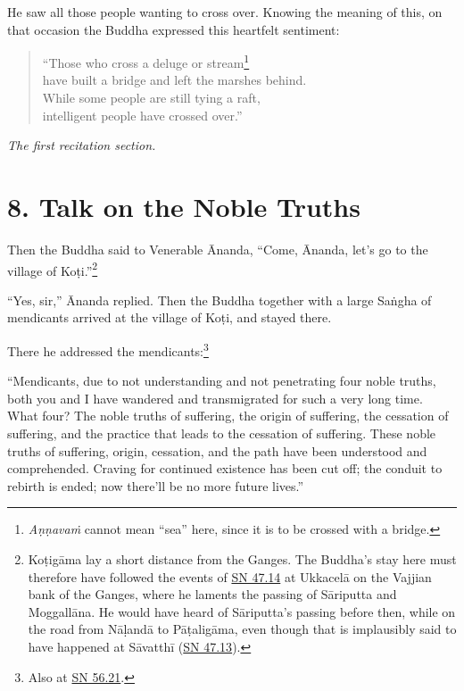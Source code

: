 \documentclass[12pt,openany]{book}%
\newcommand*{\scendsection}[1]{\begin{Center}\begin{small}\textit{#1}\end{small}\end{Center}\addvspace{1em}}
\begin{document}
He saw all those people wanting to cross over. Knowing the meaning of this, on that occasion the Buddha expressed this heartfelt sentiment: 

\begin{verse}%
“Those who cross a deluge or stream\footnote{\textit{\textsanskrit{Aṇṇavaṁ}} cannot mean “sea” here, since it is to be crossed with a bridge. } \\
have built a bridge and left the marshes behind. \\
While some people are still tying a raft, \\
intelligent people have crossed over.” 

%
\end{verse}

\scendsection{The first recitation section. }

\section*{8. Talk on the Noble Truths }

Then the Buddha said to Venerable Ānanda, “Come, Ānanda, let’s go to the village of \textsanskrit{Koṭi}.”\footnote{\textsanskrit{Koṭigāma} lay a short distance from the Ganges. The Buddha’s stay here must therefore have followed the events of \href{https://suttacentral.net/sn47.14/en/sujato}{SN 47.14} at \textsanskrit{Ukkacelā} on the Vajjian bank of the Ganges, where he laments the passing of \textsanskrit{Sāriputta} and \textsanskrit{Moggallāna}. He would have heard of \textsanskrit{Sāriputta}’s passing before then, while on the road from \textsanskrit{Nāḷandā} to \textsanskrit{Pāṭaligāma}, even though that is implausibly said to have happened at \textsanskrit{Sāvatthī} (\href{https://suttacentral.net/sn47.13/en/sujato}{SN 47.13}). } 

“Yes, sir,” Ānanda replied. Then the Buddha together with a large \textsanskrit{Saṅgha} of mendicants arrived at the village of \textsanskrit{Koṭi}, and stayed there. 

There he addressed the mendicants:\footnote{Also at \href{https://suttacentral.net/sn56.21/en/sujato}{SN 56.21}. } 

“Mendicants, due to not understanding and not penetrating four noble truths, both you and I have wandered and transmigrated for such a very long time. What four? The noble truths of suffering, the origin of suffering, the cessation of suffering, and the practice that leads to the cessation of suffering. These noble truths of suffering, origin, cessation, and the path have been understood and comprehended. Craving for continued existence has been cut off; the conduit to rebirth is ended; now there’ll be no more future lives.” 
\end{document}

